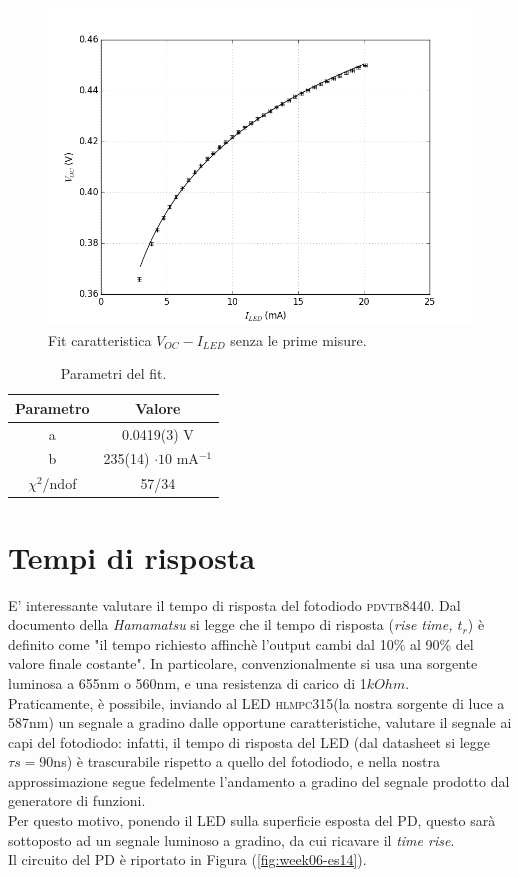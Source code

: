 \documentclass[journal, a4paper]{IEEEtran}
\begin{document}
\begin{figure}[htp]
\centering
\includegraphics[scale=.4]{hm4_2}
\caption{Fit caratteristica $V_{OC}-I_{LED}$ senza le prime misure.}
\label{fig:hm4_2}
\end{figure}

\begin{table}[htp]
\centering
\caption{Parametri del fit.}
\label{tab:fit2}
\begin{tabular}{|c|c|}
\hline 
Parametro & Valore \\ 
\hline 
a & 0.0419(3) V \\ 
\hline 
b & 235(14) $\cdot 10$ mA$^{-1}$ \\ 
\hline 
$\chi^2$/ndof & 57/34 \\ 
\hline 
\end{tabular} 
\end{table}


\section{Tempi di risposta}

E' interessante valutare il tempo di risposta del fotodiodo \textsc{pdvtb8440}. Dal documento della \textit{Hamamatsu} si legge che il tempo di risposta (\textit{rise time, $t_r$}) è definito come "il tempo richiesto affinchè l'output cambi dal 10\% al 90\% del valore finale costante". In particolare, convenzionalmente si usa una sorgente luminosa a 655nm o 560nm, e una resistenza di carico di 1$k\si{Ohm}$. \\
Praticamente, è possibile, inviando al LED \textsc{hlmpc315}(la nostra sorgente di luce a 587nm) un segnale a gradino dalle opportune caratteristiche, valutare il segnale ai capi del fotodiodo: infatti, il tempo di risposta del LED (dal datasheet si legge $\tau s = 90$ns) è trascurabile rispetto a quello del fotodiodo, e nella nostra approssimazione segue fedelmente l'andamento a gradino del segnale prodotto dal generatore di funzioni. \\
Per questo motivo, ponendo il LED sulla superficie esposta del PD, questo sarà sottoposto ad un segnale luminoso a gradino, da cui ricavare il \textit{time rise}.\\
Il circuito del PD è riportato in Figura (\ref{fig:week06-es14}).
\end{document}
